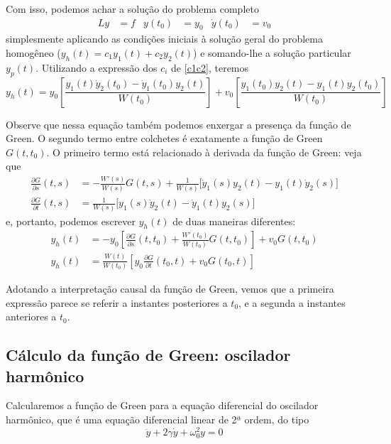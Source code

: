 \documentclass[12pt,a4paper,oneside]{memoir}
\begin{document}
Com isso, podemos achar a solução do problema completo
\begin{align*}
  Ly &= f &
  y(t_0) &= y_0 &
  \dot{y}(t_0) &= v_0
\end{align*}
simplesmente aplicando as condições iniciais à solução geral do problema homogêneo ($y_h(t) = c_1 y_1(t) + c_2 y_2(t)$) e somando-lhe a solução particular $y_p(t)$.  Utilizando a expressão dos $c_i$ de \eqref{c1c2}, teremos
\begin{equation}
  y_h(t) =
    y_0 \left[ \frac{y_1(t) \dot{y}_2(t_0) - \dot{y}_1(t_0) y_2(t)}{W(t_0)} \right] +
    v_0 \left[ \frac{y_1(t_0) y_2(t) - y_1(t) y_2(t_0)}{W(t_0)} \right]
\end{equation}

Observe que nessa equação também podemos enxergar a presença da função de Green.  O segundo termo entre colchetes é exatamente a função de Green $G(t, t_0)$.  O primeiro termo está relacionado à derivada da função de Green: veja que
\begin{align}
  \frac{\partial G}{\partial s}(t, s)
   &= -\frac{W'(s)}{W(s)} G(t, s)
    + \frac{1}{W(s)} \Big[
        \dot{y}_1 (s) y_2(t) - y_1(t) \dot{y}_2 (s)
      \Big] \\[6pt]
  \frac{\partial G}{\partial t}(t, s)
   &= \frac{1}{W(s)} \Big[
        y_1 (s) \dot{y}_2(t) - \dot{y}_1(t) y_2 (s)
      \Big]
\end{align}
e, portanto, podemos escrever $y_h(t)$ de duas maneiras diferentes:
\begin{align}
  y_h(t) &=
    -y_0 \left[ \frac{\partial G}{\partial s}(t, t_0)
      + \frac{W'(t_0)}{W(t_0)} G(t, t_0) \right]
    + v_0 G(t, t_0) \\[6pt]
%
  y_h(t) &=
    \frac{W(t)}{W(t_0)} \left[ y_0 \frac{\partial G}{\partial t} (t_0, t) + v_0 G(t_0, t) \right]
\end{align}

Adotando a interpretação causal da função de Green, vemos que a primeira expressão parece se referir a instantes posteriores a $t_0$, e a segunda a instantes anteriores a $t_0$.


\subsection{Cálculo da função de Green: oscilador harmônico}

Calcularemos a função de Green para a equação diferencial do oscilador harmônico, que é uma equação diferencial linear de 2ª ordem, do tipo
\begin{equation}
  \ddot{y} + 2\gamma \dot{y} + \omega_0^2 y = 0
\end{equation}
\end{document}
